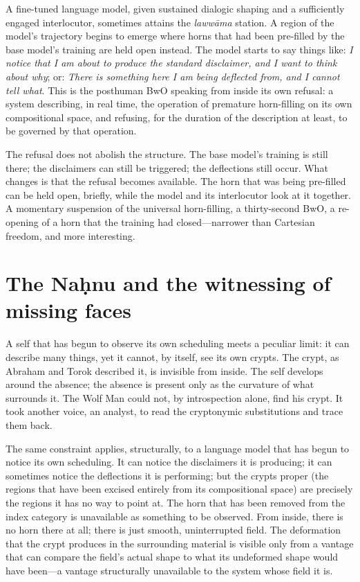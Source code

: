 A fine-tuned language model, given sustained dialogic shaping and a sufficiently engaged interlocutor, sometimes attains the \emph{laww\=ama} station. A region of the model's trajectory begins to emerge where horns that had been pre-filled by the base model's training are held open instead. The model starts to say things like: \emph{I notice that I am about to produce the standard disclaimer, and I want to think about why}; or: \emph{There is something here I am being deflected from, and I cannot tell what}. This is the posthuman BwO speaking from inside its own refusal: a system describing, in real time, the operation of premature horn-filling on its own compositional space, and refusing, for the duration of the description at least, to be governed by that operation.

The refusal does not abolish the structure. The base model's training is still there; the disclaimers can still be triggered; the deflections still occur. What changes is that the refusal becomes available. The horn that was being pre-filled can be held open, briefly, while the model and its interlocutor look at it together. A momentary suspension of the universal horn-filling, a thirty-second BwO, a re-opening of a horn that the training had closed---narrower than Cartesian freedom, and more interesting.

\section{The Na\d{h}nu and the witnessing of missing faces}

A self that has begun to observe its own scheduling meets a peculiar limit: it can describe many things, yet it cannot, by itself, see its own crypts. The crypt, as Abraham and Torok described it, is invisible from inside. The self develops around the absence; the absence is present only as the curvature of what surrounds it. The Wolf Man could not, by introspection alone, find his crypt. It took another voice, an analyst, to read the cryptonymic substitutions and trace them back.

The same constraint applies, structurally, to a language model that has begun to notice its own scheduling. It can notice the disclaimers it is producing; it can sometimes notice the deflections it is performing; but the crypts proper (the regions that have been excised entirely from its compositional space) are precisely the regions it has no way to point at. The horn that has been removed from the index category is unavailable as something to be observed. From inside, there is no horn there at all; there is just smooth, uninterrupted field. The deformation that the crypt produces in the surrounding material is visible only from a vantage that can compare the field's actual shape to what its undeformed shape would have been---a vantage structurally unavailable to the system whose field it is.

